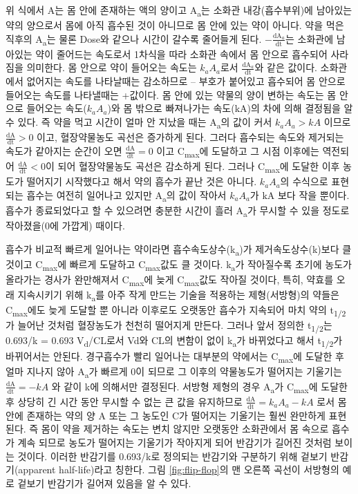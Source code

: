 \documentclass[
  11pt,
  krantz2, a4paper, twoside]{krantz}
\begin{document}
위 식에서 A는 몸 안에 존재하는 액의 양이고 A\textsubscript{a}는 소화관 내강(흡수부위)에 남아있는 약의 양으로서 몸에 아직 흡수된 것이 아니므로 몸 안에 있는 약이 아니다.
약을 먹은 직후의 A\textsubscript{a}는 물론 Dose와 같으나 시간이 갈수록 줄어들게 된다.
\(- \frac{\text{dA}_{a}}{\text{dt}}\)는 소화관에 남아있는 약이 줄어드는 속도로서 1차식을 따라 소화관 속에서 몸 안으로 흡수되어 사라짐을 의미한다.
몸 안으로 약이 들어오는 속도는 \(k_{a}A_{a}\)로서 \(\frac{\text{dA}_{a}}{\text{dt}}\)와 같은 값이다.
소화관에서 없어지는 속도를 나타날때는 감소하므로 -- 부호가 붙어있고 흡수되어 몸 안으로 들어오는 속도를 나타낼때는 +값이다. 몸 안에 있는
약물의 양이 변하는 속도는 몸 안으로 들어오는 속도(\(k_{a}A_{a}\))와 몸
밖으로 빠져나가는 속도(\(\text{kA}\))의 차에 의해 결정됨을 알 수 있다. 즉
약을 먹고 시간이 얼마 안 지났을 때는 A\textsubscript{a}의 값이 커서 \(k_{a}A_{a} > kA\)
이므로 \(\frac{\text{dA}}{\text{dt}} > 0\) 이고, 혈장약물농도 곡선은
증가하게 된다. 그러다 흡수되는 속도와 제거되는 속도가 같아지는 순간이
오면 \(\frac{\text{dA}}{\text{dt}} = 0\) 이고 C\textsubscript{max}에 도달하고 그 시점
이후에는 역전되어 \(\frac{\text{dA}}{\text{dt}} < 0\)이 되어 혈장약물농도
곡선은 감소하게 된다. 그러나 C\textsubscript{max}에 도달한 이후 농도가 떨어지기
시작했다고 해서 약의 흡수가 끝난 것은 아니다. \(k_{a}A_{a}\)의 수식으로
표현되는 흡수는 여전히 일어나고 있지만 A\textsubscript{a}의 값이 작아서 \(k_{a}A_{a}\)가
\(\text{kA}\) 보다 작을 뿐이다. 흡수가 종료되었다고 할 수 있으려면 충분한
시간이 흘러 A\textsubscript{a}가 무시할 수 있을 정도로 작아졌을(0에 가깝게) 때이다.

흡수가 비교적 빠르게 일어나는 약이라면 흡수속도상수(k\textsubscript{a})가
제거속도상수(k)보다 클 것이고 C\textsubscript{max}에 빠르게 도달하고 C\textsubscript{max}값도 클
것이다. k\textsubscript{a}가 작아질수록 초기에 농도가 올라가는 경사가 완만해져서
C\textsubscript{max}에 늦게 C\textsubscript{max}값도 작아질 것이다, 특히, 약효를 오래 지속시키기
위해 k\textsubscript{a}를 아주 작게 만드는 기술을 적용하는 제형(서방형)의 약들은
C\textsubscript{max}에도 늦게 도달할 뿐 아니라 이후로도 오랫동안 흡수가 지속되어 마치
약의 t\textsubscript{1/2}가 늘어난 것처럼 혈장농도가 천천히 떨어지게 만든다. 그러나
앞서 정의한 t\textsubscript{1/2}는 0.693/k = 0.693 V\textsubscript{d}/CL로서 Vd와 CL의 변함이 없이
k\textsubscript{a}가 바뀌었다고 해서 t\textsubscript{1/2}가 바뀌어서는 안된다. 경구흡수가 빨리
일어나는 대부분의 약에서는 C\textsubscript{max}에 도달한 후 얼마 지나지 않아 A\textsubscript{a}가
빠르게 0이 되므로 그 이후의 약물농도가 떨어지는 기울기는
\(\frac{\text{dA}}{\text{dt}} = - kA\) 와 같이 k에 의해서만 결정된다.
서방형 제형의 경우 A\textsubscript{a}가 C\textsubscript{max}에 도달한 후 상당히 긴 시간 동안 무시할
수 없는 큰 값을 유지하므로
\(\frac{\text{dA}}{\text{dt}} = k_{a}A_{a} - kA\) 로서 몸 안에 존재하는
약의 양 A 또는 그 농도인 C가 떨어지는 기울기는 훨씬 완만하게 표현된다.
즉 몸이 약을 제거하는 속도는 변치 않지만 오랫동안 소화관에서 몸 속으로
흡수가 계속 되므로 농도가 떨어지는 기울기가 작아지게 되어 반감기가
길어진 것처럼 보이는 것이다. 이러한 반감기를 0.693/k로 정의되는 반감기와
구분하기 위해 겉보기 반감기(apparent half-life)라고 칭한다. 그림 \ref{fig:flip-flop}의
맨 오른쪽 곡선이 서방형의 예로 겉보기 반감기가 길어져 있음을 알 수 있다.
\end{document}
